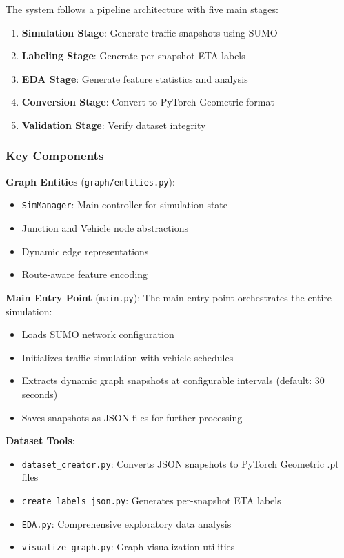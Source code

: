 The system follows a pipeline architecture with five main stages:

\begin{enumerate}
    \item \textbf{Simulation Stage}: Generate traffic snapshots using SUMO
    \item \textbf{Labeling Stage}: Generate per-snapshot ETA labels
    \item \textbf{EDA Stage}: Generate feature statistics and analysis
    \item \textbf{Conversion Stage}: Convert to PyTorch Geometric format
    \item \textbf{Validation Stage}: Verify dataset integrity
\end{enumerate}

\subsubsection{Key Components}

\textbf{Graph Entities} (\texttt{graph/entities.py}):
\begin{itemize}
    \item \texttt{SimManager}: Main controller for simulation state
    \item Junction and Vehicle node abstractions
    \item Dynamic edge representations
    \item Route-aware feature encoding
\end{itemize}

\textbf{Main Entry Point} (\texttt{main.py}):
The main entry point orchestrates the entire simulation:
\begin{itemize}
    \item Loads SUMO network configuration
    \item Initializes traffic simulation with vehicle schedules
    \item Extracts dynamic graph snapshots at configurable intervals (default: 30 seconds)
    \item Saves snapshots as JSON files for further processing
\end{itemize}

\textbf{Dataset Tools}:
\begin{itemize}
    \item \texttt{dataset\_creator.py}: Converts JSON snapshots to PyTorch Geometric .pt files
    \item \texttt{create\_labels\_json.py}: Generates per-snapshot ETA labels
    \item \texttt{EDA.py}: Comprehensive exploratory data analysis
    \item \texttt{visualize\_graph.py}: Graph visualization utilities
\end{itemize}

